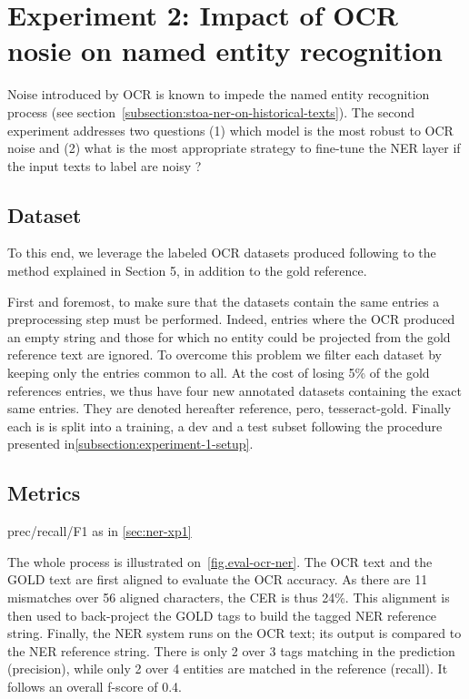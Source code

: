 \section{Experiment 2: Impact of OCR nosie on named entity recognition}
\label{sec:ner-xp2}
Noise introduced by OCR is known to impede the named entity recognition process (see section~\ref{subsection:stoa-ner-on-historical-texts}).
The second experiment addresses two questions (1) which model is the most robust to OCR noise and (2) what is the most appropriate strategy to fine-tune the NER layer if the input texts to label are noisy ?

\subsection{Dataset}

To this end, we leverage the labeled OCR datasets produced following to the method explained in Section 5, in addition to the gold reference.

First and foremost, to make sure that the datasets contain the same entries a preprocessing step must be performed.
Indeed, entries where the OCR produced an empty string and those for which no entity could be projected from the gold reference text are ignored.
To overcome this problem we filter each dataset by keeping only the entries common to all.
At the cost of losing  5\% of the gold references entries, we thus have four new annotated datasets containing the exact same entries.
They are denoted hereafter {reference, pero, tesseract}-gold.
Finally each is is split into a training, a dev and a test subset following the procedure presented in\cref{subsection:experiment-1-setup}.



\subsection{Metrics}
prec/recall/F1 as in \ref{sec:ner-xp1}

The whole process is illustrated on~\cref{fig.eval-ocr-ner}. The OCR text and the GOLD text are first aligned to
evaluate the OCR accuracy. As there are 11 mismatches over 56 aligned characters, the CER is thus 24\%. This alignment
is then used to back-project the GOLD tags to build the tagged NER reference string. Finally, the NER system runs on the
OCR text; its output is compared to the NER reference string. There is only 2 over 3 tags matching in the prediction (precision),
while only 2 over 4 entities are matched in the reference (recall). It follows an overall f-score of 0.4.

